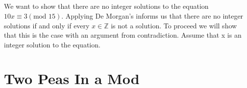 \documentclass[11pt]{article}
\newcommand{\Z}{\mathbb{Z}}
\begin{document}
\subsection{} %
We want to show that there are no integer solutions to the equation $10x \equiv 3 (\text{mod } 15)$. Applying De Morgan's informs us that there are no integer solutions if and only if every $x \in \Z$ is not a solution. To proceed we will show that this is the case with an argument from contradiction. Assume that x is an integer solution to the equation. 

\subsection{} %


\section{Two Peas In a Mod} %
\end{document}
